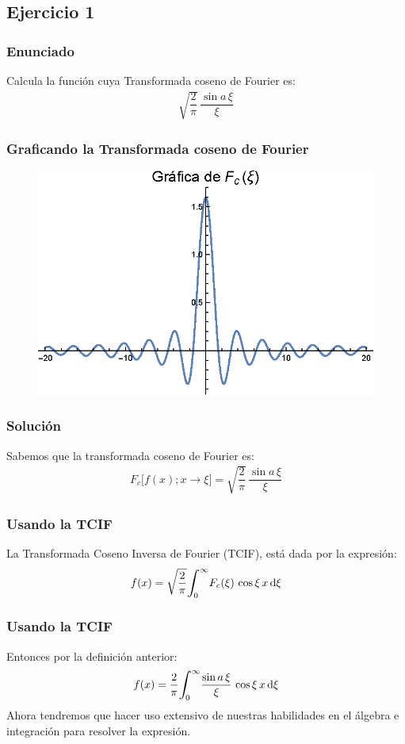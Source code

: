 \documentclass[12pt]{beamer}
\begin{document}
\subsection*{Ejercicio 1}
\begin{frame}
\frametitle{Enunciado}
Calcula la función cuya Transformada coseno de Fourier es:
\pause
\begin{align*}
\sqrt{\dfrac{2}{\pi}} \, \dfrac{\sin a \, \xi}{\xi}
\end{align*}
\end{frame}
\begin{frame}
\frametitle{Graficando la Transformada coseno de Fourier}
\begin{figure}
  \centering
  \includegraphics[scale=1]{Imagenes/Plot_Fourier_Ejercicios_01_sinc_x.eps}
\end{figure}
\end{frame}
\begin{frame}
\frametitle{Solución}
Sabemos que la transformada coseno de Fourier es:
\pause
\begin{align*}
F_{c} \big[ f (x); x \to \xi \big] = \sqrt{\dfrac{2}{\pi}} \, \dfrac{\sin a \, \xi}{\xi}
\end{align*}
\end{frame}
\begin{frame}
\frametitle{Usando la TCIF}
La Transformada Coseno Inversa de Fourier (TCIF), está dada por la expresión:
\pause
\begin{align*}
f (x) = \sqrt{\dfrac{2}{\pi}} \scaleint{6ex}_{\bs 0}^{\infty} F_{c} (\xi) \, \cos \xi \, x \dd{\xi}
\end{align*}
\end{frame}
\begin{frame}
\frametitle{Usando la TCIF}
Entonces por la definición anterior:
\pause
\begin{align*}
f (x) = \dfrac{2}{\pi} \scaleint{6ex}_{\bs 0}^{\infty} \dfrac{\sin a \, \xi}{\xi} \, \cos \xi \, x \dd{\xi}
\end{align*}
\pause
Ahora tendremos que hacer uso extensivo de nuestras habilidades en el álgebra e integración para resolver la expresión.
\end{frame}
\end{document}
